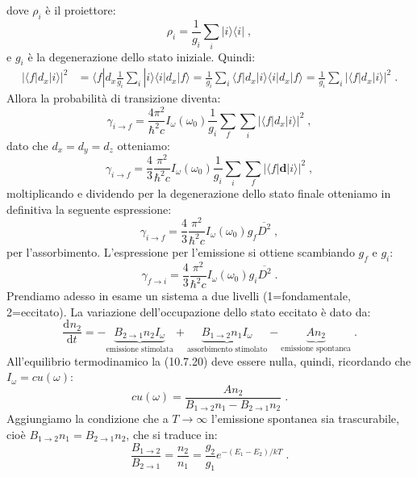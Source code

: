 \documentclass[12pt,a4paper]{report}
\theoremstyle{definition}
\newcommand{\dev}[3][]{\frac{\mathrm{d}^{#1} #2}{\mathrm{d} #3^{#1}}}
\numberwithin{equation}{section}
\newcommand{\bra}{\langle}
\newcommand{\ket}{\rangle}
\begin{document}
dove $\rho_i$ è il proiettore:
\begin{equation}
\rho_i=\frac{1}{g_i}\sum_i |i\ket\bra i|\;,
\end{equation}
e $g_i$ è la degenerazione dello stato iniziale. Quindi:
\begin{align}
|\bra f|d_x|i\ket|^2 &= \bra f|d_x \frac{1}{g_i}\sum_i|i\ket\bra i|d_x|f\ket= \frac{1}{g_i}\sum_i \bra f|d_x|i\ket\bra i|d_x|f\ket= \frac{1}{g_i}\sum_i |\bra f|d_x|i\ket|^2\;.
\end{align}
Allora la probabilità di transizione diventa:
\begin{equation}
\gamma_{i\to f}=\frac{4\pi^2}{\hbar^2 c}I_{\omega}(\omega_0)\frac{1}{g_i}\sum_f\sum_i|\bra f|d_x|i\ket|^2\;,
\end{equation}
dato che $d_x=d_y=d_z$ otteniamo:
\begin{equation}
\gamma_{i\to f}=\frac{4}{3}\frac{\pi^2}{\hbar^2 c}I_{\omega}(\omega_0)\frac{1}{g_i}\sum_i\sum_f|\bra f|\mathbf{d}|i\ket|^2\;,
\end{equation}
moltiplicando e dividendo per la degenerazione dello stato finale otteniamo in definitiva la seguente espressione:
\begin{equation}
\gamma_{i\to f}=\frac{4}{3}\frac{\pi^2}{\hbar^2 c}I_{\omega}(\omega_0)g_f\overline{D^2}\;,
\end{equation}
per l'assorbimento. L'espressione per l'emissione si ottiene scambiando $g_f$ e $g_i$:
\begin{equation}
\gamma_{f\to i}=\frac{4}{3}\frac{\pi^2}{\hbar^2 c}I_{\omega}(\omega_0)g_i\overline{D^2}\;.
\end{equation}
Prendiamo adesso in esame un sistema a due livelli (1=fondamentale, 2=eccitato). La variazione dell'occupazione dello stato eccitato è dato da:
\begin{equation}
\dev{n_2}{t}=-\underbrace{B_{2\to 1}n_2I_{\omega}}_{\mbox{emissione stimolata}}+\underbrace{B_{1\to2}n_1I_{\omega}}_{\mbox{assorbimento stimolato}}-\underbrace{An_2}_{\mbox{emissione spontanea}}\;.
\end{equation}
All'equilibrio termodinamico la (10.7.20) deve essere nulla, quindi, ricordando che $I_{\omega}=cu(\omega)$:
\begin{equation}
cu(\omega)=\frac{An_2}{B_{1\to 2}n_1-B_{2\to 1}n_2}\;.
\end{equation}
Aggiungiamo la condizione che a $T\to\infty$ l'emissione spontanea sia trascurabile, cioè $B_{1\to 2}n_1=B_{2\to 1}n_2$, che si traduce in:
\begin{equation}
\frac{B_{1\to 2}}{B_{2\to 1}}=\frac{n_2}{n_1}=\frac{g_2}{g_1}e^{-(E_1-E_2)/kT}\;.
\end{equation}
\end{document}
